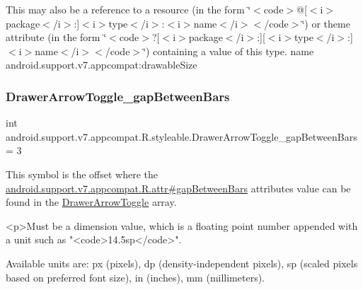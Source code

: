 This may also be a reference to a resource (in the form \char`\"{}$<$code$>$@\mbox{[}$<$i$>$package$<$/i$>$\+:\mbox{]}$<$i$>$type$<$/i$>$\+:$<$i$>$name$<$/i$>$$<$/code$>$\char`\"{}) or theme attribute (in the form \char`\"{}$<$code$>$?\mbox{[}$<$i$>$package$<$/i$>$\+:\mbox{]}\mbox{[}$<$i$>$type$<$/i$>$\+:\mbox{]}$<$i$>$name$<$/i$>$$<$/code$>$\char`\"{}) containing a value of this type.  name android.\+support.\+v7.\+appcompat\+:drawable\+Size \mbox{\label{classandroid_1_1support_1_1v7_1_1appcompat_1_1R_1_1styleable_a737c92b3ede20bdc07b042896c38c3c2}} 
\subsubsection{\texorpdfstring{Drawer\+Arrow\+Toggle\+\_\+gap\+Between\+Bars}{DrawerArrowToggle\_gapBetweenBars}}
{\footnotesize\ttfamily int android.\+support.\+v7.\+appcompat.\+R.\+styleable.\+Drawer\+Arrow\+Toggle\+\_\+gap\+Between\+Bars = 3\hspace{0.3cm}{\ttfamily [static]}}

This symbol is the offset where the \hyperlink{classandroid_1_1support_1_1v7_1_1appcompat_1_1R_1_1attr_a0ad90ce19f7d1a362e8a173250778b3b}{android.\+support.\+v7.\+appcompat.\+R.\+attr\#gap\+Between\+Bars} attribute\textquotesingle{}s value can be found in the \hyperlink{classandroid_1_1support_1_1v7_1_1appcompat_1_1R_1_1styleable_a7bd3ecc07eb763b454c40c0871959a35}{Drawer\+Arrow\+Toggle} array.

\begin{DoxyVerb}      <p>Must be a dimension value, which is a floating point number appended with a unit such as "<code>14.5sp</code>".
\end{DoxyVerb}
 Available units are\+: px (pixels), dp (density-\/independent pixels), sp (scaled pixels based on preferred font size), in (inches), mm (millimeters). 

